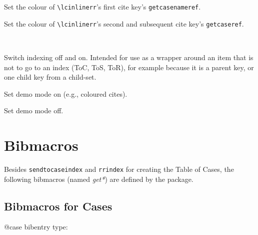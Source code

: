 
Set the colour of \texttt{\textbackslash lcinlinerr}'s first cite key's \colorbox{red!10}{\texttt{getcasenameref}}. %
\bigskip
	

Set the colour of \texttt{\textbackslash lcinlinerr}'s second and subsequent cite key's \colorbox{yellow!20}{\texttt{getcaseref}}.
\bigskip

 \\

\label{indexoffon}Switch indexing off and on. Intended for use as a wrapper around an item that is not to go to an index (ToC, ToS, ToR), for example because it is a parent key, or one child key from a child-set.
\bigskip


	


Set demo mode on (e.g., coloured cites).
\bigskip


Set demo mode off.
\bigskip

	
	
	
	
	
	
	
	
\section{Bibmacros}
Besides \texttt{sendtocaseindex} and \texttt{rrindex} for creating the Table of Cases, the following bibmacros (named \textit{get*}) are defined by the package.


\subsection{Bibmacros for Cases}
@case bibentry type:

